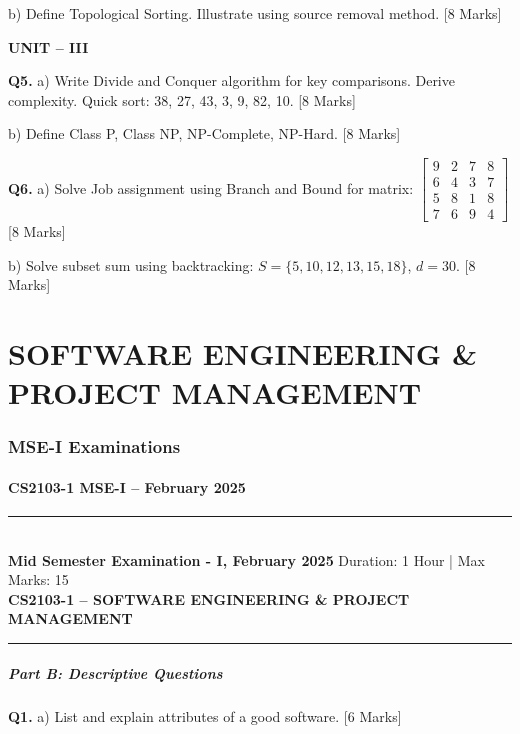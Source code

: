 \documentclass[11pt,a4paper]{article}
\newcommand{\examheader}[4]{
\noindent\rule{\textwidth}{0.5pt}\\
\textbf{#1} \hfill Duration: #3 | Max Marks: #4\\
\textbf{#2}\\
\rule{\textwidth}{0.5pt}
\vspace{0.2cm}
}
\begin{document}
b) Define Topological Sorting. Illustrate using source removal method. \hfill [8 Marks]

\textbf{UNIT -- III}

\textbf{Q5.} a) Write Divide and Conquer algorithm for key comparisons. Derive complexity. Quick sort: 38, 27, 43, 3, 9, 82, 10. \hfill [8 Marks]

b) Define Class P, Class NP, NP-Complete, NP-Hard. \hfill [8 Marks]

\textbf{Q6.} a) Solve Job assignment using Branch and Bound for matrix:
$\begin{bmatrix} 9 & 2 & 7 & 8 \\ 6 & 4 & 3 & 7 \\ 5 & 8 & 1 & 8 \\ 7 & 6 & 9 & 4 \end{bmatrix}$ \hfill [8 Marks]

b) Solve subset sum using backtracking: $S = \{5, 10, 12, 13, 15, 18\}$, $d = 30$. \hfill [8 Marks]

\newpage
\part{SOFTWARE ENGINEERING \& PROJECT MANAGEMENT}

\section{MSE-I Examinations}

\subsection{CS2103-1 MSE-I -- February 2025}
\examheader{Mid Semester Examination - I, February 2025}{CS2103-1 -- SOFTWARE ENGINEERING \& PROJECT MANAGEMENT}{1 Hour}{15}

\subsubsection*{Part B: Descriptive Questions}

\textbf{Q1.} a) List and explain attributes of a good software. \hfill [6 Marks]
\end{document}
